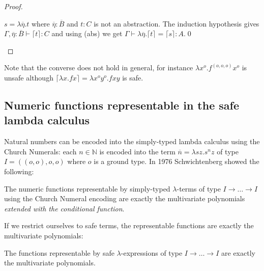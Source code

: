 \documentclass{llncs}
\newcommand{\elnf}[1]{\lceil #1\rceil} %
\newcommand{\encode}[1]{\overline{#1}} \newcommand\dps{\displaystyle}
\newcommand\nat{\mathbb{N}}
\begin{document}
\begin{proof}
\begin{compactitem}
\item $s = \lambda \overline{\eta} . t $ where 
$\overline{\eta} : \overline{B}$ and $t:C$ is not an abstraction. The induction hypothesis gives $\Gamma,
  \overline{\eta} : \overline{B} \vdash \elnf{t} : C$ and using
{\sf(abs)} we get $\Gamma \vdash \lambda \overline{\eta} . \elnf{t} = \elnf{s} : A$.\qed
\end{compactitem}
\end{proof}

Note that the converse does not hold in general, for instance $\lambda
x^o . f^{(o,o,o)} x^o$ is unsafe although $\elnf{\lambda x . f x} =
\lambda x^o y^o . f x y$ is safe.

\subsection*{Numeric functions representable in the safe lambda calculus}

Natural numbers can be encoded into the simply-typed
lambda calculus using the Church Numerals: each $n\in\nat$ is
encoded into the term $\encode{n} = \lambda s z. s^n z$ of type $I =
((o,o),o,o)$ where $o$ is a ground type. In 1976 Schwichtenberg
\cite{citeulike:622637} showed the following:


\begin{theorem}[Schwichtenberg 1976]
The numeric functions representable by simply-typed $\lambda$-terms of
type $I\rightarrow \ldots \rightarrow I$ using the Church Numeral
encoding are exactly the multivariate polynomials \emph{extended with
the conditional function}.
\end{theorem}

If we restrict ourselves to safe terms, the representable functions are
exactly the multivariate polynomials:
\begin{theorem}
\label{thm:polychar}
The functions representable by safe $\lambda$-expressions of type
$I\rightarrow \ldots \rightarrow I$ are exactly the multivariate
polynomials.
\end{theorem}
\end{document}
